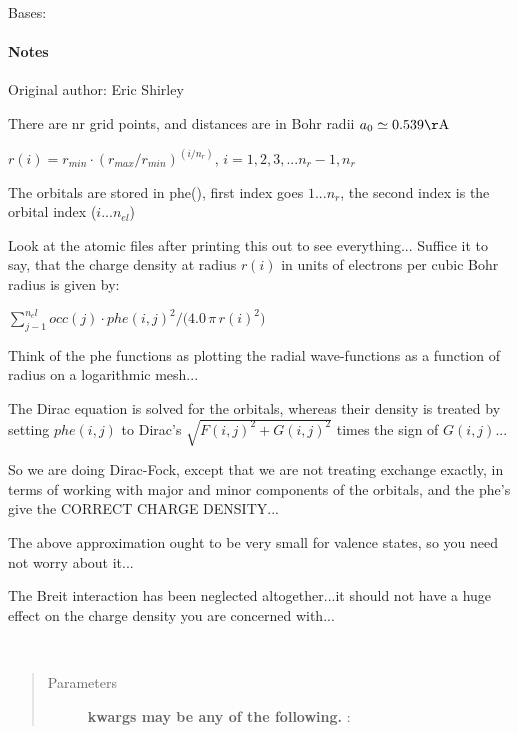 \documentclass[letterpaper,10pt,english]{sphinxmanual}
\begin{document}
\begin{fulllineitems}
\label{modules:phaseshifts.atorb.Atorb}
Bases: 
\paragraph{Notes}

Original author: Eric Shirley

There are nr grid points, and distances are in Bohr radii
\(a_0 \simeq 0.539 \mathrm{\AA}\)

\(r(i) = r_{min} \cdot (r_{max} / r_{min})^{(i/n_r)}\), 
\(i=1,2,3,...n_r-1,n_r\)

The orbitals are stored in phe(), first index goes \(1...n_r\), the
second index is the orbital index (\(i...n_{el}\))

Look at the atomic files after printing this out to see everything...
Suffice it to say, that the charge density at radius \(r(i)\)
in units of electrons per cubic Bohr radius is given by:

\(\sum_{j-1}^{n_el}{occ(j) \cdot phe(i,j)^2 / (4.0\,\pi\,{r(i)^2)}}\)

Think of the phe functions as plotting the radial wave-functions
as a function of radius on a logarithmic mesh...

The Dirac equation is solved for the orbitals, whereas their density
is treated by setting \(phe(i,j)\) to Dirac's 
\(\sqrt{F(i,j)^2 + G(i,j)^2}\) times the sign of \(G(i,j)\)...

So we are doing Dirac-Fock, except that we are not treating exchange 
exactly, in terms of working with major and minor components of the 
orbitals, and the phe's give the CORRECT CHARGE DENSITY...

The above approximation ought to be very small for valence states,
so you need not worry about it...

The Breit interaction has been neglected altogether...it should not 
have a huge effect on the charge density you are concerned with...

\begin{fulllineitems}
\label{modules:phaseshifts.atorb.Atorb.calculate_Q_density}~\begin{quote}\begin{description}
\item[{Parameters}] \leavevmode
\textbf{kwargs may be any of the following.} :


\end{description}
\end{quote}
\end{fulllineitems}
\end{fulllineitems}
\end{document}
